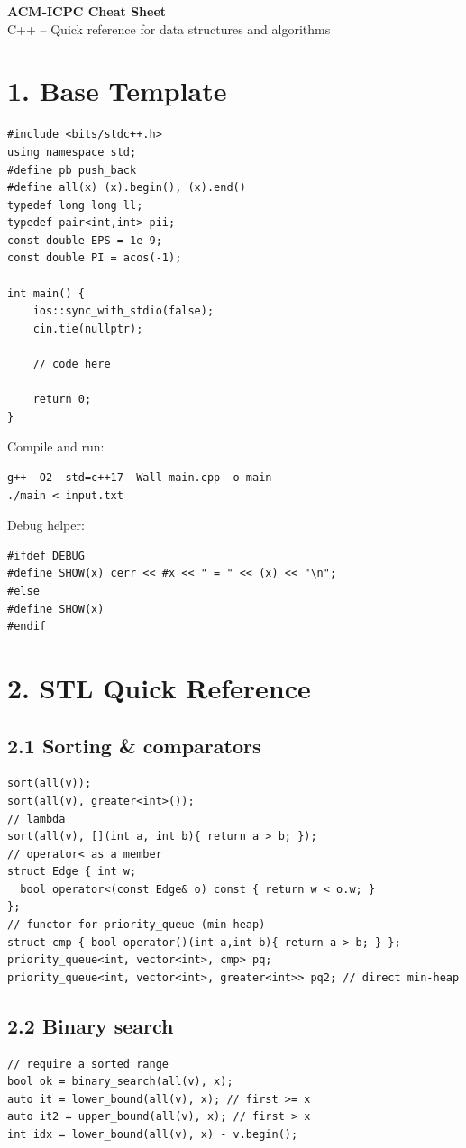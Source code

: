 \documentclass[11pt]{extarticle}
\begin{document}
\begin{center}
{\LARGE \bfseries ACM-ICPC Cheat Sheet}\\[2pt]
{\normalsize C++ -- Quick reference for data structures and algorithms}
\end{center}
\vspace{4pt}

\section*{1. Base Template}
\begin{lstlisting}
#include <bits/stdc++.h>
using namespace std;
#define pb push_back
#define all(x) (x).begin(), (x).end()
typedef long long ll;
typedef pair<int,int> pii;
const double EPS = 1e-9;
const double PI = acos(-1);

int main() {
    ios::sync_with_stdio(false);
    cin.tie(nullptr);

    // code here

    return 0;
}
\end{lstlisting}
Compile and run:
\begin{lstlisting}
g++ -O2 -std=c++17 -Wall main.cpp -o main
./main < input.txt
\end{lstlisting}
Debug helper:
\begin{lstlisting}
#ifdef DEBUG
#define SHOW(x) cerr << #x << " = " << (x) << "\n";
#else
#define SHOW(x)
#endif
\end{lstlisting}

\section*{2. STL Quick Reference}
\subsection*{2.1 Sorting \& comparators}
\begin{lstlisting}
sort(all(v));
sort(all(v), greater<int>());
// lambda
sort(all(v), [](int a, int b){ return a > b; });
// operator< as a member
struct Edge { int w;
  bool operator<(const Edge& o) const { return w < o.w; }
};
// functor for priority_queue (min-heap)
struct cmp { bool operator()(int a,int b){ return a > b; } };
priority_queue<int, vector<int>, cmp> pq;
priority_queue<int, vector<int>, greater<int>> pq2; // direct min-heap
\end{lstlisting}

\subsection*{2.2 Binary search}
\begin{lstlisting}
// require a sorted range
bool ok = binary_search(all(v), x);
auto it = lower_bound(all(v), x); // first >= x
auto it2 = upper_bound(all(v), x); // first > x
int idx = lower_bound(all(v), x) - v.begin();
\end{lstlisting}
\end{document}
